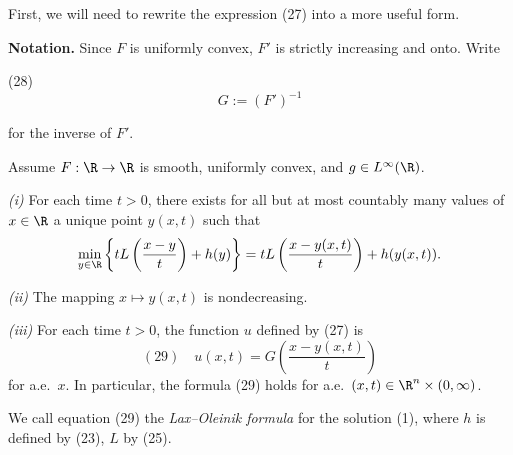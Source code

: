 First, we will need to rewrite the expression (27) into a more useful form.

\textbf{Notation.} Since $F$ is uniformly convex, $F'$ is strictly increasing and onto. Write

(28)
$$G := (F')^{-1}$$

for the inverse of $F'$.

\begin{theorem}
\label{thm:lax-oleinik-formula}
Assume $F : \R \to \R$ is smooth, uniformly convex, and $g \in L^\infty(\R)$.

\textit{(i)} For each time $t > 0$, there exists for all but at most countably many values of $x \in \R$ a unique point $y(x,t)$ such that
$$\min_{y \in \R} \left\{ tL\left(\frac{x-y}{t}\right) + h(y) \right\} = tL\left(\frac{x-y(x,t)}{t}\right) + h(y(x,t)).$$

\textit{(ii)} The mapping $x \mapsto y(x,t)$ is nondecreasing.

\textit{(iii)} For each time $t > 0$, the function $u$ defined by (27) is
$$(29) \quad u(x,t) = G\left(\frac{x-y(x,t)}{t}\right)$$
for a.e.\ $x$. In particular, the formula (29) holds for a.e.\ $(x,t) \in \R^n \times (0,\infty)$.
\end{theorem}

\begin{definition}
\label{def:lax-oleinik-formula}
We call equation (29) the \textit{Lax--Oleinik formula} for the solution (1), where $h$ is defined by (23), $L$ by (25).
\end{definition}

